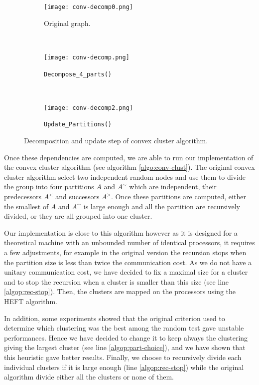 \documentclass[10pt, conference, compsocconf,pdftex,dvipsnames]{IEEEtran}
\begin{document}
\begin{figure}[t!]
    \centering
    \begin{subfigure}{0.24\textwidth}
        \centering
        \texttt{[image: conv-decomp0.png]}
        \caption{Original graph.}
        \label{fig:conv-decomp0}
    \end{subfigure}
    ~
    \begin{subfigure}{0.27\textwidth}
        \centering
        \texttt{[image: conv-decomp.png]}
        \caption{\texttt{Decompose\_4\_parts()}}
        \label{fig:conv-decomp1}
    \end{subfigure}
    ~
    \begin{subfigure}{0.27\textwidth}
        \centering
        \texttt{[image: conv-decomp2.png]}
        \caption{\texttt{Update\_Partitions()}}
        \label{fig:conv-decomp2}
    \end{subfigure}
    \caption{Decomposition and update step of convex cluster algorithm.}
    \label{fig:conv-decomp}
\end{figure}


Once these dependencies are computed, we are able to run our implementation of
the convex cluster algorithm (see algorithm \ref{algo:conv-clust}). The
original convex cluster algorithm select two independent random nodes and use
them to divide the group into four partitions $A$ and $A^{\sim}$ which are
independent, their predecessors $A^<$ and successors $A^>$. Once these
partitions are computed, either the smallest of $A$ and $A^{\sim}$ is large
enough and all the partition are recursively divided, or they are all grouped
into one cluster. 

Our implementation is close to this algorithm however as it is designed for a
theoretical machine with an unbounded number of identical processors, it
requires a few adjustments, for example in the original version the recursion
stops when the partition size is less than twice the communication cost. As we
do not have a unitary communication cost, we have decided to fix a maximal
size for a cluster and to stop the recursion when a cluster is smaller than
this size (see line \ref{algop:rec-stop}). Then, the clusters are mapped on the
processors using the HEFT algorithm. 

In addition, some experiments showed that the original criterion used to
determine which clustering was the best among the random test gave unstable
performances. Hence we have decided to change it to keep always the clustering
giving the largest cluster (see line \ref{algop:part-choice}), and we have
shown that this heuristic gave better results. Finally, we choose to
recursively divide each individual clusters if it is large enough (line
\ref{algop:rec-stop}) while the original algorithm divide either all the
clusters or none of them.
\end{document}
